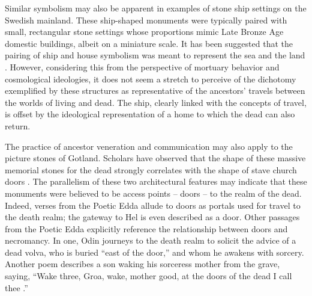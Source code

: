 Similar symbolism may also be apparent in examples of stone ship settings on the Swedish mainland. These ship-shaped monuments were typically paired with small, rectangular stone settings whose proportions mimic Late Bronze Age domestic buildings, albeit on a miniature scale. It has been suggested that the pairing of ship and house symbolism was meant to represent the sea and the land \parencite[93]{Bradley_2010}. However, considering this from the perspective of mortuary behavior and cosmological ideologies, it does not seem a stretch to perceive of the dichotomy exemplified by these structures as representative of the ancestors’ travels between the worlds of living and dead. The ship, clearly linked with the concepts of travel, is offset by the ideological representation of a home to which the dead can also return.

The practice of ancestor veneration and communication may also apply to the picture stones of Gotland. Scholars have observed that the shape of these massive memorial stones for the dead strongly correlates with the shape of stave church doors \parencite[195-196]{Eriksen_2013}.
The parallelism of these two architectural features may indicate that these monuments were believed to be access points – doors – to the realm of the dead. Indeed, verses from the Poetic Edda allude to doors as portals used for travel to the death realm; the gateway to Hel is even described as a door. Other passages from the Poetic Edda explicitly reference the relationship between doors and necromancy. In one, Odin journeys to the death realm to solicit the advice of a dead volva, who is buried “east of the door,” and whom he awakens with sorcery. Another poem describes a son waking his sorceress mother from the grave, saying, “Wake three, Groa, wake, mother good, at the doors of the dead I call thee \parencite[191-194]{Eriksen_2013}.”

